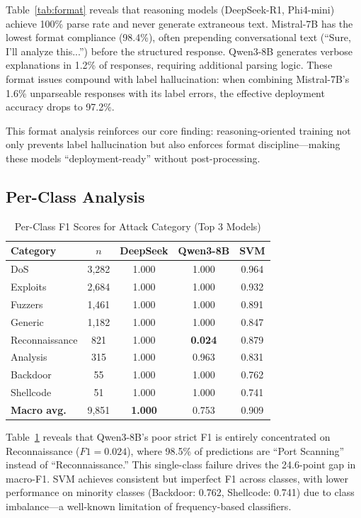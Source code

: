 \documentclass[journal]{IEEEtran}
\begin{document}
Table~\ref{tab:format} reveals that reasoning models (DeepSeek-R1, Phi4-mini) achieve 100\% parse rate and never generate extraneous text. Mistral-7B has the lowest format compliance (98.4\%), often prepending conversational text (``Sure, I'll analyze this...'') before the structured response. Qwen3-8B generates verbose explanations in 1.2\% of responses, requiring additional parsing logic. These format issues compound with label hallucination: when combining Mistral-7B's 1.6\% unparseable responses with its label errors, the effective deployment accuracy drops to 97.2\%.

This format analysis reinforces our core finding: reasoning-oriented training not only prevents label hallucination but also enforces format discipline---making these models ``deployment-ready'' without post-processing.

\subsection{Per-Class Analysis}

\begin{table}[!ht]
\centering
\caption{Per-Class F1 Scores for Attack Category (Top 3 Models)}
\label{tab:perclass}
\begin{tabular}{lcccc}
\toprule
\textbf{Category} & \textbf{$n$} & \textbf{DeepSeek} & \textbf{Qwen3-8B} & \textbf{SVM} \\
\midrule
DoS & 3,282 & 1.000 & 1.000 & 0.964 \\
Exploits & 2,684 & 1.000 & 1.000 & 0.932 \\
Fuzzers & 1,461 & 1.000 & 1.000 & 0.891 \\
Generic & 1,182 & 1.000 & 1.000 & 0.847 \\
Reconnaissance & 821 & 1.000 & \textbf{0.024} & 0.879 \\
Analysis & 315 & 1.000 & 0.963 & 0.831 \\
Backdoor & 55 & 1.000 & 1.000 & 0.762 \\
Shellcode & 51 & 1.000 & 1.000 & 0.741 \\
\midrule
\textbf{Macro avg.} & 9,851 & \textbf{1.000} & 0.753 & 0.909 \\
\bottomrule
\end{tabular}
\end{table}

Table~\ref{tab:perclass} reveals that Qwen3-8B's poor strict F1 is entirely concentrated on Reconnaissance ($F1=0.024$), where 98.5\% of predictions are ``Port Scanning'' instead of ``Reconnaissance.'' This single-class failure drives the 24.6-point gap in macro-F1. SVM achieves consistent but imperfect F1 across classes, with lower performance on minority classes (Backdoor: 0.762, Shellcode: 0.741) due to class imbalance---a well-known limitation of frequency-based classifiers.
\end{document}
